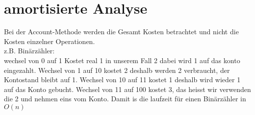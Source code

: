 \documentclass[a4paper]{scrartcl}
\begin{document}
\section{amortisierte Analyse}

Bei der Account-Methode werden die Gesamt Kosten betrachtet und nicht die Kosten einzelner Operationen.\\
z.B. Binärzähler:\\
wechsel von 0 auf 1 Kostet real 1 in unserem Fall 2 dabei wird 1 auf das konto eingezahlt. Wechsel von 1 auf 10 kostet 2 deshalb werden 2 verbraucht, der Kontostand bleibt auf 1. Wechsel von 10 auf 11 kostet 1 deshalb wird wieder 1 auf das Konto gebucht. Wechsel von 11 auf 100 kostet 3, das heisst wir verwenden die 2 und nehmen eins vom Konto. Damit is die laufzeit für einen Binärzähler in $O(n)$
\end{document}
